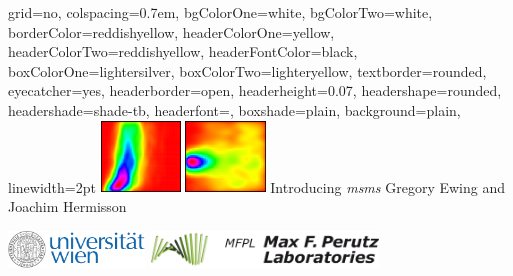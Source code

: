 \documentclass[portrait,final]{baposter}
\begin{document}


\newcommand{\bs}[1]{\boldsymbol{#1}}

\begin{poster}%
{
grid=no,
colspacing=0.7em,
bgColorOne=white,%
bgColorTwo=white,%
borderColor=reddishyellow, 
headerColorOne=yellow,
headerColorTwo=reddishyellow, 
headerFontColor=black,
boxColorOne=lightersilver,
boxColorTwo=lighteryellow,
textborder=rounded,
eyecatcher=yes,
headerborder=open,
headerheight=0.07\textheight,
headershape=rounded,
headershade=shade-tb,
headerfont=\Large\textsf, %
boxshade=plain, 
background=plain,
linewidth=2pt
}
{\includegraphics[height=1.9cm]{eyeCatch1.png}\hspace{.2cm} 
\includegraphics[height=1.9cm]{eyeCatch2.png}} 
{\sc\Huge Introducing {\it msms}}
{\sc \hspace{1cm} Gregory Ewing and Joachim Hermisson
}
{
\begin{minipage}{0.2625\textwidth}
\includegraphics[height=1cm]{uni_logo_farbe_01.pdf}
\newline
\includegraphics[height=1cm]{mfpl_logo3d_transparent.png}

\end{minipage}}
\end{poster}
\end{document}
